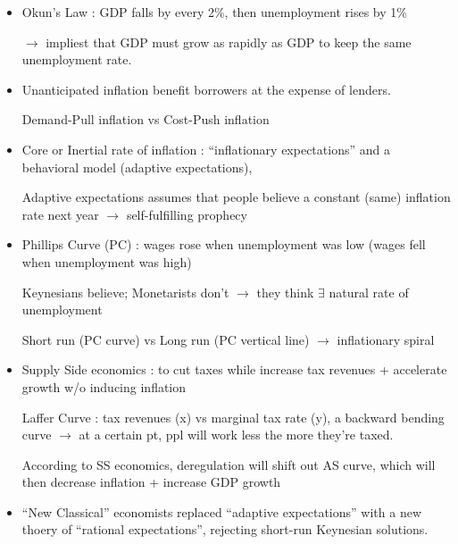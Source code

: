 \documentclass{article}
\begin{document}
\newpage
{}
\begin{itemize}
\item Okun's Law : GDP falls by every 2\%, then unemployment rises by 1\%

$\rightarrow$ impliest that  GDP must grow as rapidly as  GDP to keep the same unemployment rate.

\item Unanticipated inflation benefit borrowers at the expense of lenders.

Demand-Pull inflation vs Cost-Push inflation

\item Core or Inertial rate of inflation : ``inflationary expectations'' and a behavioral model (adaptive expectations),

Adaptive expectations assumes that people believe a constant (same) inflation rate next year $\rightarrow$ self-fulfilling prophecy


\item Phillips Curve (PC) : wages rose when unemployment was low (wages fell when unemployment was high)

Keynesians believe; Monetarists don't $\rightarrow$ they think $\exists$ natural rate of unemployment

Short run (PC curve) vs Long run (PC vertical line) $\rightarrow$ inflationary spiral

\item Supply Side economics : to cut taxes while increase tax revenues + accelerate growth w/o inducing inflation

Laffer Curve : tax revenues (x) vs marginal tax rate (y), a backward bending curve $\rightarrow$ at a certain pt, ppl will work less the more they're taxed.

According to SS economics, deregulation will shift out AS curve, which will then decrease inflation + increase GDP growth

\item ``New Classical'' economists replaced ``adaptive expectations'' with a new thoery of ``rational expectations'', rejecting short-run Keynesian solutions.
\end{itemize}
\end{document}
